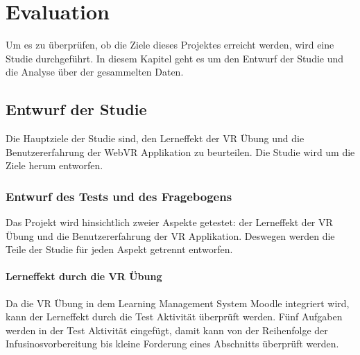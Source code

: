 \chapter{Evaluation}

Um es zu überprüfen, ob die Ziele dieses Projektes erreicht werden, wird eine Studie durchgeführt. In diesem Kapitel geht es um den Entwurf der Studie und die Analyse über der gesammelten Daten.

\section{Entwurf der Studie}

Die Hauptziele der Studie sind, den Lerneffekt der VR Übung und die Benutzererfahrung der WebVR Applikation zu beurteilen. Die Studie wird um die Ziele herum entworfen.

\subsection{Entwurf des Tests und des Fragebogens}

Das Projekt wird hinsichtlich zweier Aspekte getestet: der Lerneffekt der VR Übung und die Benutzererfahrung der VR Applikation. Deswegen werden die Teile der Studie für jeden Aspekt getrennt entworfen.

\subsubsection{Lerneffekt durch die VR Übung}

Da die VR Übung in dem Learning Management System Moodle integriert wird, kann der Lerneffekt durch die Test Aktivität überprüft werden. Fünf Aufgaben werden in der Test Aktivität eingefügt, damit kann von der Reihenfolge der Infusinosvorbereitung bis kleine Forderung eines Abschnitts überprüft werden.

